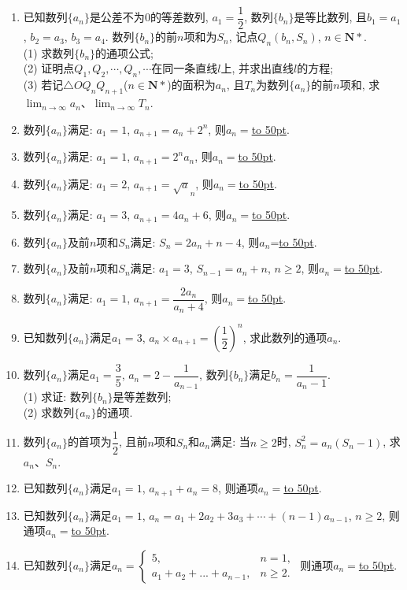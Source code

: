\documentclass[10pt,a4paper]{article}
\newcommand{\blank}[1]{\underline{\hbox to #1pt{}}}
\begin{document}
\begin{enumerate}[1.]
\item 已知数列$\{a_n\}$是公差不为$0$的等差数列, $a_1=\dfrac 12$, 数列$\{b_n\}$是等比数列, 且$b_1=a_1$, $b_2=a_3$, $b_3=a_4$. 数列$\{b_n\}$的前$n$项和为$S_n$, 记点${Q_n}(b_n,S_n)$, $n\in \mathbf{N}*$.\\
(1) 求数列$\{b_n\}$的通项公式;\\
(2) 证明点$Q_1,Q_2,\cdots,Q_n,\cdots$在同一条直线$l$上, 并求出直线$l$的方程;\\
(3) 若记$\triangle OQ_nQ_{n+1}$($n\in \mathbf{N}*$)的面积为$a_n$, 且${T_n}$为数列$\{a_n\}$的前$n$项和, 求$\displaystyle\lim_{n\to \infty}a_n$、$\displaystyle\lim_{n\to \infty}T_n$.
 



\item 数列$\{a_n\}$满足: $a_1=1$, $a_{n+1}=a_n+2^n$, 则$a_n=$\blank{50}.
\item 数列$\{a_n\}$满足: $a_1=1$, $a_{n+1}=2^na_n$, 则$a_n=$\blank{50}.
\item 数列$\{a_n\}$满足: $a_1=2$, $a_{n+1}=\sqrt a_n$, 则$a_n=$\blank{50}.
\item 数列$\{a_n\}$满足: $a_1=3$, $a_{n+1}=4a_n+6$, 则$a_n=$\blank{50}.
\item 数列$\{a_n\}$及前$n$项和$S_n$满足: $S_n=2a_n+n-4$, 则$a_n$=\blank{50}.
\item 数列$\{a_n\}$及前$n$项和$S_n$满足: $a_1=3$, $S_{n-1}=a_n+n$, $n\ge 2$, 则$a_n=$\blank{50}.
\item 数列$\{a_n\}$满足: $a_1=1$, $a_{n+1}=\dfrac{2a_n}{a_n+4}$, 则$a_n=$\blank{50}.
\item 已知数列$\{a_n\}$满足$a_1=3$, $a_n\times a_{n+1}=(\dfrac 12)^n$, 求此数列的通项$a_n$.
\item 数列$\{a_n\}$满足$a_1=\dfrac 35$, $a_n=2-\dfrac 1{a_{n-1}}$, 数列$\{b_n\}$满足$b_n=\dfrac 1{a_n-1}$.\\
(1) 求证: 数列$\{b_n\}$是等差数列;\\
(2) 求数列$\{a_n\}$的通项.
\item 数列$\{a_n\}$的首项为$\dfrac 12$, 且前$n$项和$S_n$和$a_n$满足: 当$n\ge 2$时, $S_n^2=a_n(S_n-1)$, 求$a_n$、$S_n$.
\item 已知数列$\{a_n\}$满足$a_1=1$, $a_{n+1}+a_n=8$, 则通项$a_n=$\blank{50}.
\item 已知数列$\{a_n\}$满足$a_1=1$, $a_n=a_1+2a_2+3a_3+\cdots+(n-1)a_{n-1}$, $n\ge 2$, 则通项$a_n=$\blank{50}.
\item 已知数列$\{a_n\}$满足$a_n=\begin{cases} 5, & n=1, \\ a_1+a_2+...+a_{n-1}, & n\ge 2. \end{cases}$ 则通项$a_n=$\blank{50}.

\end{enumerate}
\end{document}
